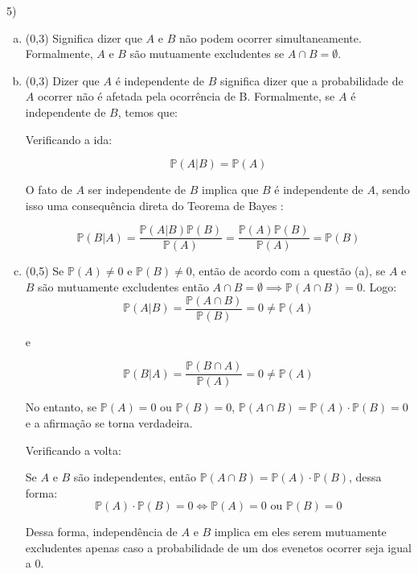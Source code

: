 \documentclass[12pt]{article}
\begin{document}
5) 
\begin{enumerate}[a)]
    \item (0,3) Significa dizer que $A$ e $B$ não podem ocorrer simultaneamente. Formalmente, $A$ e $B$ são mutuamente excludentes se $A \cap B = \emptyset$.
    \item (0,3) Dizer que $A$ é independente de $B$ significa dizer que a probabilidade de $A$ ocorrer não é afetada pela ocorrência de B. Formalmente, se $A$ é independente de $B$, temos que:
   
   Verificando a ida:

    $$\mathds{P}(A|B) = \mathds{P}(A)$$
    
    O fato de $A$ ser independente de $B$ implica que $B$ é independente de $A$, sendo isso uma consequência direta do Teorema de Bayes :

    $$\mathds{P}(B|A) = \dfrac{\mathds{P}(A|B) \mathds{P}(B)}{\mathds{P}(A)} = \dfrac{\mathds{P}(A) \mathds{P}(B)}{\mathds{P}(A)} = \mathds{P}(B)$$

    \item (0,5) Se $\mathds{P}(A) \neq 0$ e $\mathds{P}(B) \neq 0$, então de acordo com a questão (a), se $A$ e $B$ são mutuamente excludentes então $A \cap B = \emptyset \implies \mathds{P}(A \cap B)=0$. Logo:
    $$\mathds{P}(A|B) = \dfrac{\mathds{P}(A\cap B)}{\mathds{P}(B)} = 0 \neq \mathds{P}(A)$$

    e

    $$\mathds{P}(B|A) = \dfrac{\mathds{P}(B\cap A)}{\mathds{P}(A)} = 0 \neq \mathds{P}(A)$$

    No entanto, se $\mathds{P}(A) = 0$ ou $\mathds{P}(B) = 0$, $\mathds{P}(A \cap B) = \mathds{P}(A) \cdot \mathds{P}(B) = 0$ e a afirmação se torna verdadeira. 

    Verificando a volta:
    
    Se $A$ e $B$ são independentes, então $\mathds{P}(A \cap B) =\mathds{P}(A) \cdot \mathds{P}(B)$, dessa forma:
    $$\mathds{P}(A) \cdot \mathds{P}(B) = 0 \iff \mathds{P}(A) = 0 \text{ ou } \mathds{P}(B) = 0$$

    Dessa forma, independência de $A$ e $B$ implica em eles serem mutuamente excludentes apenas caso a probabilidade de um dos evenetos ocorrer seja igual a 0. 
\end{enumerate}
\end{document}
